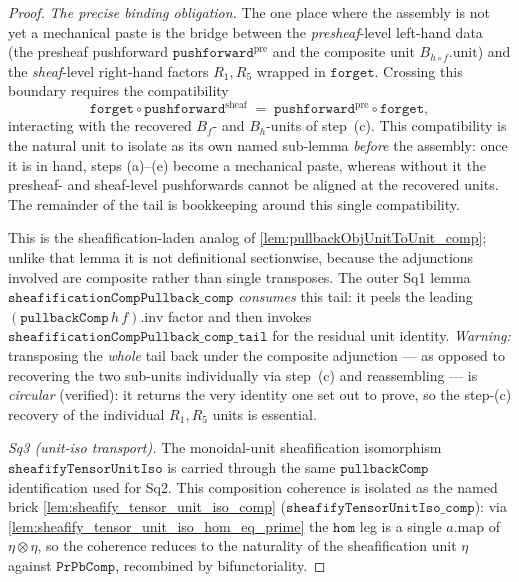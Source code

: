 \begin{proof}
  \emph{The precise binding obligation.} The one place where the assembly is not yet a
  mechanical paste is the bridge between the \emph{presheaf}-level left-hand data (the
  presheaf pushforward \(\mathtt{pushforward}^{\mathrm{pre}}\) and the composite unit
  \(B_{h\circ f}.\mathrm{unit}\)) and the \emph{sheaf}-level right-hand factors \(R_1, R_5\)
  wrapped in \(\mathtt{forget}\). Crossing this boundary requires the compatibility
  \[
    \mathtt{forget} \circ \mathtt{pushforward}^{\mathrm{sheaf}}
      \;=\;
    \mathtt{pushforward}^{\mathrm{pre}} \circ \mathtt{forget},
  \]
  interacting with the recovered \(B_f\)- and \(B_h\)-units of step~(c). This compatibility is
  the natural unit to isolate as its own named sub-lemma \emph{before} the assembly: once it
  is in hand, steps (a)--(e) become a mechanical paste, whereas without it the presheaf- and
  sheaf-level pushforwards cannot be aligned at the recovered units. The remainder of the tail
  is bookkeeping around this single compatibility.

  This is the sheafification-laden analog of \cref{lem:pullbackObjUnitToUnit_comp}; unlike
  that lemma it is not definitional sectionwise, because the adjunctions involved are
  composite rather than single transposes. The outer Sq1 lemma
  \(\mathtt{sheafificationCompPullback\_comp}\) \emph{consumes} this tail: it peels the leading
  \((\mathtt{pullbackComp}\,h\,f).\mathrm{inv}\) factor and then invokes
  \(\mathtt{sheafificationCompPullback\_comp\_tail}\) for the residual unit identity.
  \emph{Warning:} transposing the \emph{whole} tail back under the composite adjunction --- as
  opposed to recovering the two sub-units individually via step~(c) and reassembling --- is
  \emph{circular} (verified): it returns the very identity one set out to prove, so the
  step-(c) recovery of the individual \(R_1, R_5\) units is essential.

  \emph{Sq3 (unit-iso transport).} The monoidal-unit sheafification isomorphism
  \(\mathtt{sheafifyTensorUnitIso}\) is carried through the same \(\mathtt{pullbackComp}\)
  identification used for Sq2. This composition coherence is isolated as the named brick
  \cref{lem:sheafify_tensor_unit_iso_comp} (\(\mathtt{sheafifyTensorUnitIso\_comp}\)): via
  \cref{lem:sheafify_tensor_unit_iso_hom_eq_prime} the \(\mathtt{hom}\) leg is a single
  \(a.\mathrm{map}\) of \(\eta\otimes\eta\), so the coherence reduces to the naturality of the
  sheafification unit \(\eta\) against \(\mathtt{PrPbComp}\), recombined by bifunctoriality.


\end{proof}

